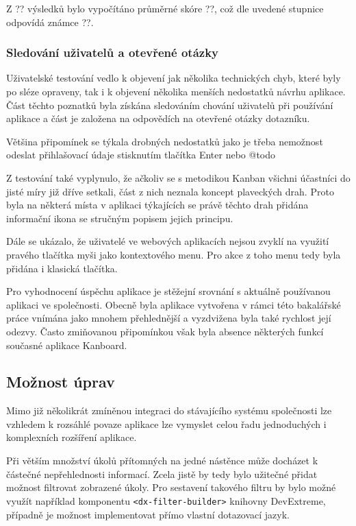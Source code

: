 Z ?? výsledků bylo vypočítáno průměrné skóre ??, což dle uvedené stupnice odpovídá známce ??.

\blindtext


\subsubsection{Sledování uživatelů a otevřené otázky}
Uživatelské testování vedlo k objevení jak několika technických chyb, které byly po sléze opraveny, tak i k objevení několika menších nedostatků návrhu aplikace. Část těchto poznatků byla získána sledováním chování uživatelů při používání aplikace a část je založena na odpovědích na otevřené otázky dotazníku. 

Většina připomínek se týkala drobných nedostatků jako je třeba nemožnost odeslat přihlašovací údaje stisknutím tlačítka Enter nebo @todo

Z testování také vyplynulo, že ačkoliv se s metodikou Kanban všichni účastníci do jisté míry již dříve setkali, část z nich neznala koncept plaveckých drah. Proto byla na některá místa v aplikaci týkajících se právě těchto drah přidána informační ikona se stručným popisem jejich principu.

Dále se ukázalo, že uživatelé ve webových aplikacích nejsou zvyklí na využití pravého tlačítka myši jako kontextového menu. Pro akce z toho menu tedy byla přidána i klasická tlačítka. 

Pro vyhodnocení úspěchu aplikace je stěžejní srovnání s aktuálně používanou aplikaci ve společnosti. Obecně byla aplikace vytvořena v rámci této bakalářské práce vnímána jako mnohem přehlednější a vyzdvižena byla také rychlost její odezvy. Často zmiňovanou připomínkou však byla absence některých funkcí současné aplikace Kanboard.

\subsection{Možnost úprav}
Mimo již několikrát zmíněnou integraci do stávajícího systému společnosti lze vzhledem k rozsáhlé povaze aplikace lze vymyslet celou řadu jednoduchých i komplexních rozšíření aplikace.

Při větším množství úkolů přítomných na jedné nástěnce může docházet k částečné nepřehlednosti informací. Zcela jistě by tedy bylo užitečné přidat možnost filtrovat zobrazené úkoly. Pro sestavení takového filtru by bylo možné využít například komponentu \texttt{<dx-filter-builder>} knihovny DevExtreme, případně je možnost implementovat přímo vlastní dotazovací jazyk.

